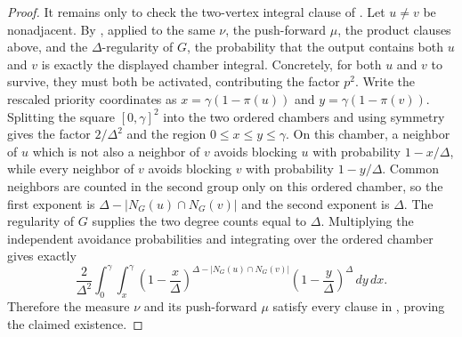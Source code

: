\begin{proof}
It remains only to check the two-vertex integral clause of
.  Let \(u\ne v\) be nonadjacent.  By
, applied to the same
\(\nu\), the push-forward \(\mu\), the product clauses above, and the
\(\Delta\)-regularity of \(G\), the probability that the output contains both
\(u\) and \(v\) is exactly the displayed chamber integral.  Concretely, for
both \(u\) and \(v\) to survive, they must both be activated, contributing
the factor \(p^2\).  Write the rescaled priority coordinates as
\(x=\gamma(1-\pi(u))\) and \(y=\gamma(1-\pi(v))\).  Splitting the square
\([0,\gamma]^2\) into the two ordered chambers and using symmetry gives the
factor \(2/\Delta^2\) and the region \(0\le x\le y\le\gamma\).  On this
chamber, a neighbor of \(u\) which is not also a neighbor of \(v\) avoids
blocking \(u\) with probability \(1-x/\Delta\), while every neighbor of
\(v\) avoids blocking \(v\) with probability \(1-y/\Delta\).  Common
neighbors are counted in the second group only on this ordered chamber, so
the first exponent is
\(\Delta-|N_G(u)\cap N_G(v)|\) and the second exponent is \(\Delta\).  The
regularity of \(G\) supplies the two degree counts equal to \(\Delta\).
Multiplying the independent avoidance probabilities and integrating over the
ordered chamber gives exactly
\[
\frac{2}{\Delta^2}\int_0^\gamma\int_x^\gamma
\left(1-\frac{x}{\Delta}\right)^{
\Delta-|N_G(u)\cap N_G(v)|}
\left(1-\frac{y}{\Delta}\right)^\Delta\,dy\,dx .
\]
Therefore the measure \(\nu\) and its push-forward \(\mu\) satisfy every
clause in , proving the claimed
existence.
\end{proof}
